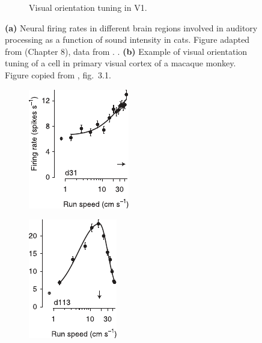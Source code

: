 \documentclass[10pt,letterpaper,oneside]{article}
\begin{document}
\begin{figure}[p]
\begin{subfigure}[b]{0.5\textwidth}
		\caption{Visual orientation tuning in V1.}
		\label{fig:eliasmith_et_al_2003_orientation_tuning}
	\end{subfigure}
	\caption{\textbf{(a)} Neural firing rates in different brain regions involved in auditory processing as a function of sound intensity in cats. Figure adapted from \cite{mann1997nervous} (Chapter 8), data from \cite{katsuki1969neural}. . \textbf{(b)} Example of visual orientation tuning of a cell in primary visual cortex of a macaque monkey. Figure copied from \cite{eliasmith2003neural}, fig.~3.1.}
	\label{fig:tuning_curves_1}
\end{figure}

\begin{figure}[p]
	\hspace{0.5cm}
	\begin{subfigure}[b]{0.25\textwidth}%
		\centering%
		\hspace{-1cm}\includegraphics[scale=1.4]{media/saleem_et_al_tuning_curves_a.pdf}%
		\caption{}%
		\label{fig:saleem_et_al_tuning_curves_a}%
	\end{subfigure}%
	\begin{subfigure}[b]{0.25\textwidth}%
		\centering%
		\hspace{-1cm}\includegraphics[scale=1.4]{media/saleem_et_al_tuning_curves_b.pdf}%
		\caption{}%
		\label{fig:saleem_et_al_tuning_curves_b}%
	\end{subfigure}%
	\begin{subfigure}[b]{0.25\textwidth}%

\end{subfigure}
\end{figure}
\end{document}
